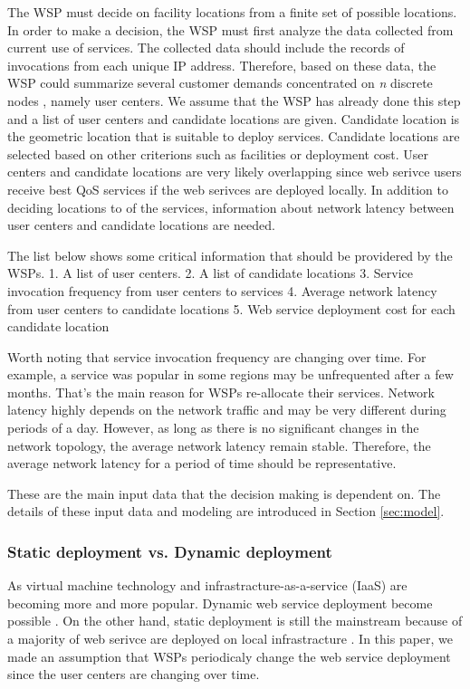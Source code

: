 \documentclass{llncs}
\begin{document}
The WSP must decide on facility locations from a finite set of possible locations. 
In order to make a decision, the WSP must first analyze the data collected from current use of services. 
The collected data should include the records of invocations from each unique IP address.
Therefore, based on these data, the WSP could summarize several customer demands concentrated on \textit{n} discrete nodes \cite{Aboolian}, namely user centers. 
We assume that the WSP has already done this step and a list of user centers and candidate 
locations are given. Candidate location is the geometric location that is suitable to 
deploy services. Candidate locations are selected based on other criterions such as 
facilities or deployment cost. User centers and candidate locations are very likely overlapping since 
web serivce users receive best QoS services if the web serivces are deployed locally.
In addition to deciding locations to of the services, information about network latency between user centers and candidate locations are needed. 


The list below shows some critical information that should be providered by the WSPs. 1. A list of user centers.
	2. A list of candidate locations
	3. Service invocation frequency from user centers to services
	4. Average network latency from user centers to candidate locations
	5. Web service deployment cost for each candidate location

Worth noting that service invocation frequency are changing over time. For example, a 
service was popular in some regions may be unfrequented after a few months. That's the 
main reason for WSPs re-allocate their services. Network latency highly depends on the 
network traffic and may be very different during periods of a day. However, as long as 
there is no significant changes in the network topology, the average network latency
remain stable. Therefore, the average network latency for a period of time should be 
representative.

These are the main input data that the decision making is dependent on. The details of 
these input data and modeling are introduced in Section \ref{sec:model}. 

\subsubsection{Static deployment vs. Dynamic deployment}
As virtual machine technology and infrastracture-as-a-service (IaaS) are becoming
more and more popular. Dynamic web service deployment become possible \cite{kemps2012dynamic}. On the other hand, static deployment is still the mainstream because of a majority
of web serivce are deployed on local infrastracture \cite{He}. In this paper, we made an
assumption that WSPs periodicaly change the web service deployment since the user centers
are changing over time.
\end{document}
